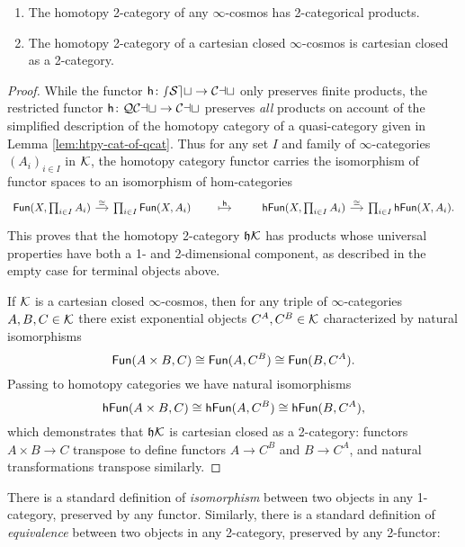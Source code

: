   \begin{prop}\label{prop:htpy-2-cat-closure}
  $\quad$
  \begin{enumerate}
  \item The homotopy 2-category of any $\infty$-cosmos has 2-categorical products.
  \item\label{itm:cart-closed} The homotopy 2-category of a cartesian closed $\infty$-cosmos is cartesian closed as a 2-category.
  \end{enumerate}
  \end{prop}
  \begin{proof}
  While the functor ${\mathord{\mathsf{h}}}\colon{\mathord{\mathcal{sSet}}} \to {\mathord{\mathcal{Cat}}}$ only preserves finite products, the restricted functor ${\mathord{\mathsf{h}}}\colon{\mathord{\mathcal{QCat}}}\to{\mathord{\mathcal{Cat}}}$ preserves \emph{all} products on account of the simplified description of the homotopy category of a quasi-category given in Lemma \ref{lem:htpy-cat-of-qcat}. Thus for any set $I$ and family of $\infty$-categories $(A_i)_{i \in I}$ in ${\mathord{\mathcal{K}}}$, the homotopy category functor carries the isomorphism of functor spaces  to an isomorphism of hom-categories
  \[ \begin{tikzcd}[column sep=small] \Fun(X,\prod_{i \in I} A_i) \arrow[r, "\cong"] & \prod_{i \in I} \Fun(X,A_i) & \arrow[r, maps to, "\ho"] & ~ & \hFun(X,\prod_{i \in I} A_i) \arrow[r, "\cong"] & \prod_{i \in I} \hFun(X,A_i).
  \end{tikzcd}
  \]
  This proves that the homotopy 2-category $\mathfrak{h}{\mathord{\mathcal{K}}}$ has products whose universal properties have both a 1- and 2-dimensional component, as described in the empty case for terminal objects above.

  If ${\mathord{\mathcal{K}}}$ is a cartesian closed $\infty$-cosmos, then for any triple of $\infty$-categories $A,B,C \in {\mathord{\mathcal{K}}}$ there exist exponential objects $C^A, C^B \in {\mathord{\mathcal{K}}}$ characterized by natural isomorphisms
  \[ {\mathord{\mathsf{Fun}}}(A \times B, C) \cong {\mathord{\mathsf{Fun}}}(A, C^B) \cong {\mathord{\mathsf{Fun}}}(B,C^A).\] Passing to homotopy categories we have natural isomorphisms
  \[ {\mathord{\mathsf{hFun}}}(A \times B, C) \cong {\mathord{\mathsf{hFun}}}(A, C^B) \cong {\mathord{\mathsf{hFun}}}(B,C^A),\] which demonstrates that $\mathfrak{h}{\mathord{\mathcal{K}}}$ is cartesian closed as a 2-category: functors $A \times B \to C$ transpose to define functors $A \to C^B$ and $B \to C^A$, and natural transformations transpose similarly.
  \end{proof}

  There is a standard definition of \emph{isomorphism} between two objects in any 1-category, preserved by any functor. Similarly, there is a standard definition of \emph{equivalence} between two objects in any 2-category, preserved by any 2-functor:

